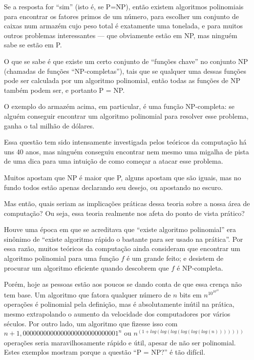 Se a resposta for ``sim'' (isto é, se P=NP), então existem algoritmos
polinomiais para encontrar os fatores primos de um número, para
escolher um conjunto de caixas num armazém cujo peso total é
exatamente uma tonelada, e para muitos outros problemas interessantes
--- que obviamente estão em NP, mas ninguém sabe se estão em P.

O que se sabe é que existe um certo conjunto de ``funções chave'' no
conjunto NP (chamadas de funções ``NP-completas''), tais que se
qualquer uma dessas funções pode ser calculada por um algoritmo polinomial, então
todas as funções de NP também podem ser, e portanto P = NP.

O exemplo do armazém acima, em particular, é uma função NP-completa: se alguém
conseguir encontrar um algoritmo polinomial para resolver esse
problema, ganha o tal milhão de dólares.

Essa questão tem sido intensamente investigada pelos teóricos da
computação há uns 40 anos, mas ninguém conseguiu encontrar nem mesmo
uma migalha de pista de uma dica para uma intuição de como começar a
atacar esse problema.

Muitos apostam que NP é maior que P, alguns
apostam que são iguais, mas no fundo todos estão apenas declarando
seu desejo, ou apostando no escuro.



Mas então, quais seriam as implicações práticas dessa teoria sobre
a nossa área de computação?
Ou seja, essa teoria realmente nos afeta do ponto de vista prático?

Houve uma época em que se acreditava que ``existe algoritmo
polinomial'' era sinônimo de ``existe algoritmo rápido o bastante
para ser usado na prática''.
Por essa razão, muitos teóricos da computação ainda
consideram que encontrar um algoritmo polinomial para uma 
função $f$ é um grande feito; e desistem de procurar um algoritmo
eficiente quando descobrem que $f$ é NP-completa.

Porém, hoje as pessoas estão aos poucos se dando conta de que essa
crença não tem base. Um algoritmo que fatora qualquer número de
$n$ bits em $n^{10^{10^{10}}}$ operações é polinomial pela definição, mas é
absolutamente inútil na prática, mesmo extrapolando o aumento da
velocidade dos computadores por vários séculos.
Por outro lado, um algoritmo que fizesse isso com $n + 1,0000000000000000000000000001^{n}$ ou
$n^{(1+log(log(log(log(log(log(n)))))))}$ operações seria maravilhosamente
rápido e útil, apesar de não ser polinomial.
Estes exemplos mostram porque a questão ``P = NP?'' é tão
difícil.

